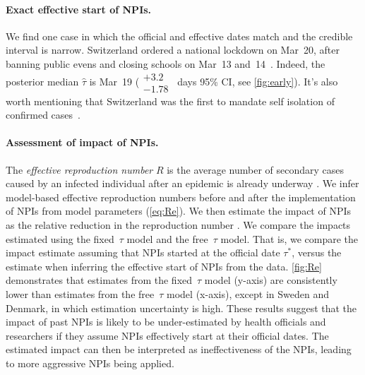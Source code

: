 \documentclass[12pt]{extarticle}
\begin{document}
\paragraph*{Exact effective start of NPIs.}
We find one case in which the official and effective dates match and the credible interval is narrow.
Switzerland ordered a national lockdown on Mar~20, after banning public evens and closing schools on Mar~13 and~14~\citep{Flaxman2020}.
Indeed, the posterior median $\hat{\tau}$ is Mar~19 ($\substack{+3.2 \\ -1.78}$~days 95\% CI, see \autoref{fig:early}). It's also worth mentioning that Switzerland was the first to mandate self isolation of confirmed cases~\citep{Flaxman2020}.



\paragraph*{Assessment of impact of NPIs.}

The \emph{effective reproduction number} $R$ is the average number of secondary
cases caused by an infected individual after an epidemic is already underway \citep{Bar-On2020a}.
We infer model-based effective reproduction numbers before and after the implementation of NPIs from model parameters (\autoref{eq:Re}).
We then estimate the impact of NPIs as the relative reduction in the reproduction number \citep{Flaxman2020}. 
We compare the impacts estimated using the fixed~$\tau$ model and the free~$\tau$ model.
That is, we compare the impact estimate assuming that NPIs started at the official date $\tau^*$, versus the estimate when inferring the effective start of NPIs from the data.
\autoref{fig:Re} demonstrates that estimates from the fixed~$\tau$ model (y-axis) are consistently lower than estimates from the free~$\tau$ model (x-axis), except in Sweden and Denmark, in which estimation uncertainty is high.
These results suggest that the impact of past NPIs is likely to be under-estimated by health officials and researchers if they assume NPIs effectively start at their official dates.
The estimated impact can then be interpreted as ineffectiveness of the NPIs, leading to more aggressive NPIs being applied.
\end{document}
